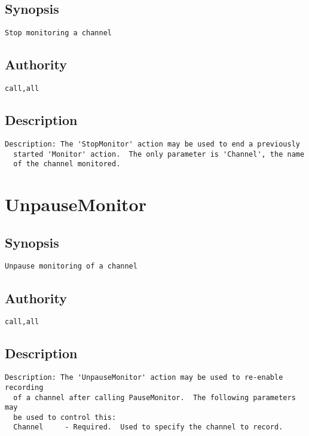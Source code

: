 \subsection{Synopsis}
\begin{verbatim}
Stop monitoring a channel
\end{verbatim}
\subsection{Authority}
\begin{verbatim}
call,all
\end{verbatim}
\subsection{Description}
\begin{verbatim}
Description: The 'StopMonitor' action may be used to end a previously
  started 'Monitor' action.  The only parameter is 'Channel', the name
  of the channel monitored.

\end{verbatim}


\section{UnpauseMonitor}
\subsection{Synopsis}
\begin{verbatim}
Unpause monitoring of a channel
\end{verbatim}
\subsection{Authority}
\begin{verbatim}
call,all
\end{verbatim}
\subsection{Description}
\begin{verbatim}
Description: The 'UnpauseMonitor' action may be used to re-enable recording
  of a channel after calling PauseMonitor.  The following parameters may
  be used to control this:
  Channel     - Required.  Used to specify the channel to record.

\end{verbatim}


